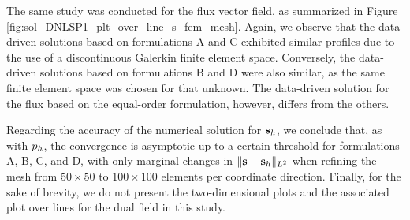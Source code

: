 The same study was conducted for the flux vector field, as summarized in Figure \ref{fig:sol_DNLSP1_plt_over_line_s_fem_mesh}. Again, we observe that the data-driven solutions based on formulations A and C exhibited similar profiles due to the use of a discontinuous Galerkin finite element space. Conversely, the data-driven solutions based on formulations B and D were also similar, as the same finite element space was chosen for that unknown. The data-driven solution for the flux based on the equal-order formulation, however, differs from the others.

Regarding the accuracy of the numerical solution for $ \mathbf{s}_h $, we conclude that, as with $ p_h  $, the convergence is asymptotic up to a certain threshold for formulations A, B, C, and D, with only marginal changes in $ \|\mathbf{s} - \mathbf{s}_h \|_{L^{2}} $ when refining the mesh from $ 50 \times 50 $ to $ 100 \times 100 $ elements per coordinate direction. Finally, for the sake of brevity, we do not present the two-dimensional plots and the associated plot over lines for the dual field in this study. 





